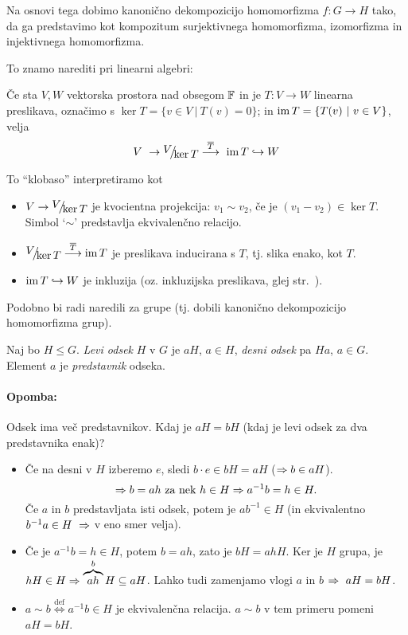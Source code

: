 \ni Na osnovi tega dobimo kanoni\v cno dekompozicijo homomorfizma $f : G \to H$ tako, da ga predstavimo kot kompozitum surjektivnega homomorfizma, izomorfizma
in injektivnega homomorfizma.

\ni To znamo narediti pri linearni algebri:
\begin{trditev}
	\v Ce sta $V, W$ vektorska prostora nad obsegom $\mathbb{F}$ in je $T : V\to W$ linearna preslikava, ozna\v cimo s $\ker T = \{v \in V\ |\ T(v) = 0\}$; in
	$\operatorname{im} T = \{T(v)\ |\ v\in V\}$, velja
	\[
		V\ \to \quot{V}{\ker T} \stackrel{\overline{T}}{\longrightarrow}\ \im T \hookrightarrow W
	\]
\end{trditev}

To "`klobaso"' interpretiramo kot
\begin{itemize}
	\item{$V \to \quot{V}{\ker T}$ je kvocientna projekcija: $v_1 \sim v_2$, \v ce je $(v_1 - v_2) \in \ker T$. Simbol `$\sim$' predstavlja ekvivalen\v cno relacijo.}
	\item{$\quot{V}{\ker T} \stackrel{\overline{T}}{\longrightarrow} \im T$ je preslikava inducirana s $T$, tj. slika enako, kot $T$.}
	\item{$\operatorname{im} T \hookrightarrow W$ je inkluzija (oz. inkluzijska preslikava, glej str.~\pageref{inkluzija}).}
\end{itemize}

Podobno bi radi naredili za grupe (tj. dobili kanoni\v cno dekompozicijo homomorfizma grup).

\pagebreak
\begin{defin}
	Naj bo $H \leq G$. \emph{Levi odsek} $H$ v $G$ je $aH$, $a \in H$, \emph{desni odsek} pa $Ha$, $a \in G$. Element $a$ je \emph{predstavnik} odseka.
\end{defin}

\paragraph{Opomba:} Odsek ima ve\v c predstavnikov. Kdaj je $aH = bH$ (kdaj je levi odsek za dva predstavnika enak)?
\begin{itemize}
	\item{\v Ce na desni v $H$ izberemo $e$, sledi $b\cdot e \in bH = aH$ ($\Rightarrow b \in aH$).
		\[
			\Rightarrow b = ah\ \text{za nek}\ h \in H \Rightarrow a^{-1}b = h \in H.
		\]
		\v Ce $a$ in $b$ predstavljata isti odsek, potem je $ab^{-1} \in H$ (in ekvivalentno $b^{-1}a \in H\ \Rightarrow$ v eno smer velja).}
	\item{\v Ce je $a^{-1}b = h \in H$, potem $b = ah$, zato je $bH = ahH$. Ker je $H$ grupa, je $hH \in H \Rightarrow \overbrace{ah}^b H \subseteq aH$. Lahko tudi
		zamenjamo vlogi $a$ in $b$ $\Rightarrow\ aH = bH$.}
	\item{$a \sim b \stackrel{\text{def}}{\iff} a^{-1}b \in H$ je ekvivalen\v cna relacija. $a \sim b$ v tem primeru pomeni $aH = bH$.}
\end{itemize}

